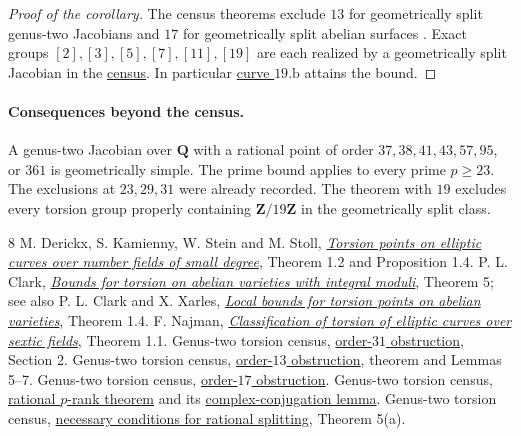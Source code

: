 \documentclass[10pt]{article}
\newcommand{\Q}{\mathbf Q}
\newcommand{\Z}{\mathbf Z}
\begin{document}
\begin{proof}[Proof of the corollary]
The census theorems exclude \(13\) for geometrically split genus-two Jacobians \cite{c13} and \(17\) for geometrically split abelian surfaces \cite{c17}. Exact groups \([2],[3],[5],[7],[11],[19]\) are each realized by a geometrically split Jacobian in the \href{https://genus-2-torsion.github.io/}{census}. In particular \href{https://genus-2-torsion.github.io/curve.html?id=19.b}{curve \(19.\mathrm b\)} attains the bound.
\end{proof}

\paragraph{Consequences beyond the census.}
A genus-two Jacobian over \(\Q\) with a rational point of order \(37,38,41,43,57,95\), or \(361\) is geometrically simple. The prime bound applies to every prime \(p\ge23\). The exclusions at \(23,29,31\) were already recorded. The theorem with \(19\) excludes every torsion group properly containing \(\Z/19\Z\) in the geometrically split class.

\begin{thebibliography}{8}
 M. Derickx, S. Kamienny, W. Stein and M. Stoll, \href{https://arxiv.org/abs/1707.00364}{\emph{Torsion points on elliptic curves over number fields of small degree}}, Theorem 1.2 and Proposition 1.4.
 P. L. Clark, \href{https://arxiv.org/abs/math/0407264}{\emph{Bounds for torsion on abelian varieties with integral moduli}}, Theorem 5; see also P. L. Clark and X. Xarles, \href{https://doi.org/10.4153/CJM-2008-026-x}{\emph{Local bounds for torsion points on abelian varieties}}, Theorem 1.4.
 F. Najman, \href{https://arxiv.org/abs/2611.03933}{\emph{Classification of torsion of elliptic curves over sextic fields}}, Theorem 1.1.
 Genus-two torsion census, \href{https://genus-2-torsion.github.io/proofs/geometric-31-obstruction.html}{order-\(31\) obstruction}, Section 2.
 Genus-two torsion census, \href{https://genus-2-torsion.github.io/proofs/qsimple-13-obstruction.html#noncyclic}{order-\(13\) obstruction}, theorem and Lemmas 5--7.
 Genus-two torsion census, \href{https://genus-2-torsion.github.io/proofs/geometric-17-obstruction.html}{order-\(17\) obstruction}.
 Genus-two torsion census, \href{https://genus-2-torsion.github.io/proofs/qsimple-rank-two-obstruction.html}{rational \(p\)-rank theorem} and its \href{https://genus-2-torsion.github.io/proofs/qsimple-rank-two-obstruction.html#complex-conjugation}{complex-conjugation lemma}.
 Genus-two torsion census, \href{https://genus-2-torsion.github.io/proofs/qsplit-necessary-conditions.html}{necessary conditions for rational splitting}, Theorem 5(a).
\end{thebibliography}
\end{document}
